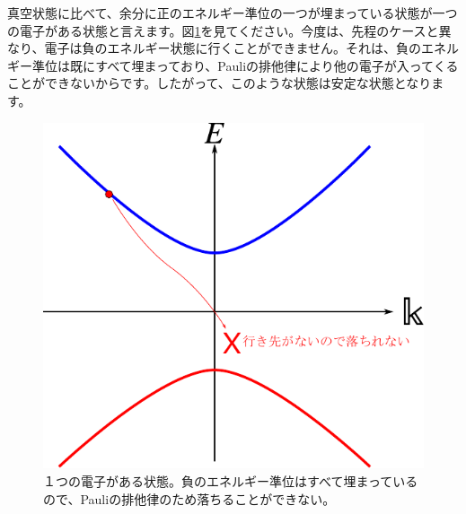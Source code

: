 \documentclass[report,paper=a4, fontsize=12pt, line_length=16cm, number_of_lines=33,dvipdfmx]{jlreq}
\numberwithin{equation}{chapter}
\begin{document}
真空状態に比べて、余分に正のエネルギー準位の一つが埋まっている状態が一つの電子がある状態と言えます。図\ref{fig:oneparticle}を見てください。今度は、先程のケースと異なり、電子は負のエネルギー状態に行くことができません。それは、負のエネルギー準位は既にすべて埋まっており、Pauliの排他律により他の電子が入ってくることができないからです。したがって、このような状態は安定な状態となります。
\begin{figure}[htbp]
  \centering
  \includegraphics{oneparticle.pdf}
  \caption{１つの電子がある状態。負のエネルギー準位はすべて埋まっているので、Pauliの排他律のため落ちることができない。}
  \label{fig:oneparticle}
\end{figure}
\end{document}
